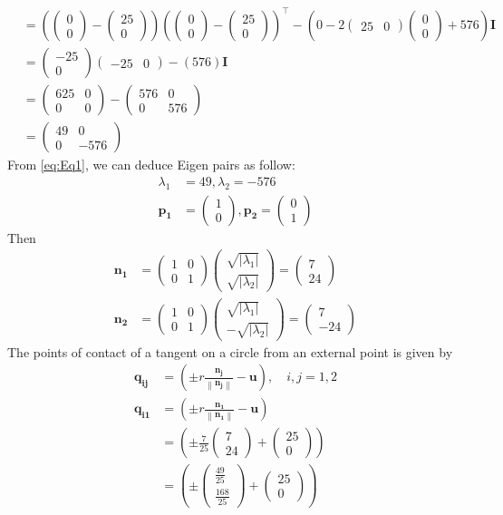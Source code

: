 \documentclass[12pt]{article}
\providecommand{\brak}[1]{\ensuremath{\left(#1\right)}}
\providecommand{\norm}[1]{\left\lVert#1\right\rVert}
\providecommand{\abs}[1]{\left\vert#1\right\vert}
\newcommand{\myvec}[1]{\ensuremath{\begin{pmatrix}#1\end{pmatrix}}}
\let\vec\mathbf
\begin{document}
\begin{enumerate}
\begin{align}
\end{align}
\begin{align}
	&= \brak{\myvec{0 \\0}-\myvec{25 \\ 0}}\brak{\myvec{0 \\ 0}-\myvec{25 \\0}}^\top - \brak{0-2\myvec{25 & 0}\myvec{0 \\0}+576}\vec{I} \\ 
	&= \myvec{-25 \\0}\myvec{-25 & 0} - \brak{576}\vec{I} \\ 
	&= \myvec{625 & 0 \\ 0 & 0 } - \myvec{576 & 0 \\ 0 & 576} \\ 
        \label{eq:Eq1}
	&= \myvec{49 & 0 \\ 0 & -576 } 
\end{align}
From \eqref{eq:Eq1}, we can deduce Eigen pairs as follow: 
\begin{align}
	\lambda_1 &= 49 , \lambda_2 = -576 \\
	\vec{p_1} &= \myvec{1 \\ 0} , \vec{p_2} = \myvec{0 \\ 1}
\end{align}
Then
\begin{align}
	\vec{n_1} &= \myvec{1 & 0 \\ 0 & 1}\myvec{\sqrt{\abs{\lambda_1}} \\ \sqrt{\abs{\lambda_2}}} = \myvec{7 \\ 24} \\
	\vec{n_2} &= \myvec{1 & 0 \\ 0 & 1}\myvec{\sqrt{\abs{\lambda_1}} \\ -\sqrt{\abs{\lambda_2}}} = \myvec{7 \\ -24}
\end{align}
The points of contact of a tangent on a circle from an external point is given by 
\begin{align}
	\vec{q_{ij}} &= \brak{\pm r \frac{\vec{n_j}}{\norm{\vec{n_j}}}- \vec{u}},  \quad i,j = 1,2 \\
	\vec{q_{i1}} &= \brak{\pm r \frac{\vec{n_1}}{\norm{\vec{n_1}}}- \vec{u}} \\
	&= \brak{\pm \frac{7}{25}\myvec{7 \\ 24}+ \myvec{25 \\ 0}} \\
	&= \brak{\pm \myvec{\frac{49}{25} \\ \frac{168}{25}} + \myvec{25 \\ 0}} \\

\end{align}
\end{enumerate}
\end{document}
